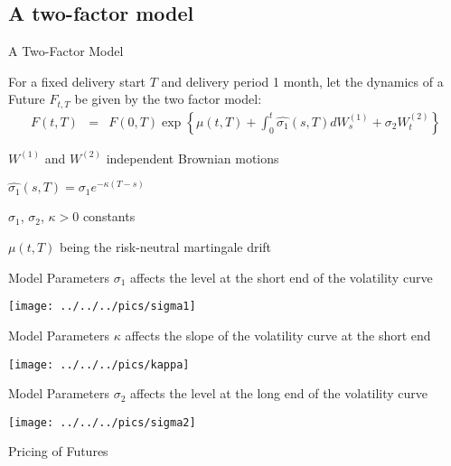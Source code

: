 \subsection{A two-factor model}

{A Two-Factor Model}







	For a fixed delivery start $T$ and delivery period 1 month, let the dynamics of a Future $F_{t,T}$ be given by the two factor model:
\begin{eqnarray*}
F(t,T)& =&F(0,T)\exp\left\{\mu(t,T)  +\int_0^t\hat{\sigma_1}(s,T)dW_s^{(1)}+\sigma_2W_t^{(2)}\right\}
\end{eqnarray*}



	$W^{(1)}$ and $W^{(2)}$ independent Brownian motions


	$\hat{\sigma_1}(s,T)=\sigma_1e^{-\kappa(T-s)}$


	$\sigma_1$, $\sigma_2$, $\kappa>0$ constants


	$\mu(t,T)$ being the risk-neutral martingale drift







{Model Parameters}
$\sigma_1$ affects the level at the short end of the volatility curve

\begin{center}
\texttt{[image: ../../../pics/sigma1]}
\end{center}




{Model Parameters}
$\kappa$ affects the slope of the volatility curve at the short end

\begin{center}
\texttt{[image: ../../../pics/kappa]}
\end{center}




{Model Parameters}
$\sigma_2$ affects the level at the long end of the volatility curve

\begin{center}
\texttt{[image: ../../../pics/sigma2]}
\end{center}




{Pricing of Futures}


